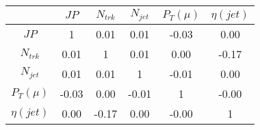 \begin{tabular}{|c|c|c|c|c|c|} 
\hline
 & $JP$ & $N_{trk}$ & $N_{jet}$ & $P_{T} (\mu)$ & $\eta (jet)$ \\ \hline
$JP$ & 1 & 0.01 & 0.01 & -0.03 & 0.00 \\
$N_{trk}$ & 0.01 & 1 & 0.01 & 0.00 & -0.17 \\
$N_{jet}$ & 0.01 & 0.01 & 1 & -0.01 & 0.00 \\
$P_{T} (\mu)$ & -0.03 & 0.00 & -0.01 & 1 & -0.00 \\
$\eta (jet)$ & 0.00 & -0.17 & 0.00 & -0.00 & 1 \\
\hline 
\end{tabular} 



